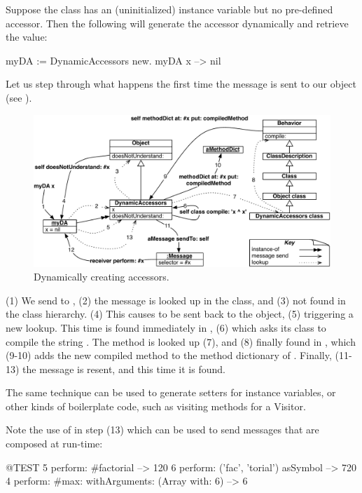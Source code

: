 \documentclass[a4paper,10pt,twoside]{book}
\begin{document}
Suppose the class  has an (uninitialized) instance variable  but no pre-defined accessor. Then the following will generate the accessor dynamically and retrieve the value:
\begin{code}{}
myDA := DynamicAccessors new.
myDA x --> nil
\end{code}

Let us step through what happens the first time the message  is sent to our object (see ).

\begin{figure}[ht]\centering
	\includegraphics[width=\linewidth]{DynamicAccessors}
	\caption{Dynamically creating accessors.}
\end{figure}

(1) We send  to , (2) the message is looked up in the class, and (3) not found in the class hierarchy. (4) This causes  to be sent back to the object, (5) triggering a new lookup. This time  is found immediately in , (6) which asks its class to compile the string . The  method is looked up (7), and (8) finally found in , which (9-10) adds the new compiled method to the method dictionary of . Finally, (11-13) the message is resent, and this time it is found.

The same technique can be used to generate setters for instance variables, or other kinds of boilerplate code, such as visiting methods for a Visitor.

Note the use of  in step (13) which can be used to send messages that are composed at run-time:
\begin{code}{@TEST}
5 perform: #factorial                                             --> 120
6 perform: ('fac', 'torial') asSymbol                       --> 720
4 perform: #max: withArguments: (Array with: 6) --> 6
\end{code}
\end{document}

